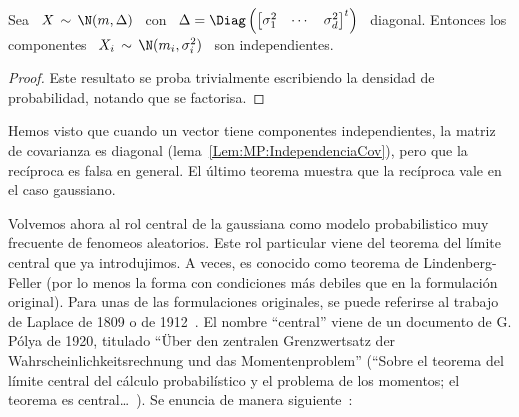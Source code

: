 %
\begin{teorema}[Independencia]
\label{Teo:MP:IndependenciaGaussiana}
%
  Sea   \   $X  \,   \sim   \,   \N(m,\Delta)$  \   con   \   $\Delta  =   \Diag
  \left(  \begin{bmatrix}  \sigma_1^2  &  \cdots  &  \sigma_d^2  \end{bmatrix}^t
  \right)$   \  diagonal.   Entonces  los   componentes  \   $X_i  \,   \sim  \,
  \N(m_i,\sigma_i^2)$ \ son independientes.
\end{teorema}
%
\begin{proof}
  Este resultato se proba  trivialmente escribiendo la densidad de probabilidad,
  notando que se factorisa.
\end{proof}
%
Hemos visto que cuando un  vector tiene componentes independientes, la matriz de
covarianza  es   diagonal  (lema~\ref{Lem:MP:IndependenciaCov}),  pero   que  la
rec\'iproca es falsa en general.  El \'ultimo teorema muestra que la rec\'iproca
vale en el caso gaussiano.

Volvemos ahora  al rol  central de la  gaussiana como modelo  probabilistico muy
frecuente  de fenomeos  aleatorios. Este  rol particular  viene del  teorema del
l\'imite  central que ya  introdujimos.  A  veces, es  conocido como  teorema de
Lindenberg-Feller (por lo menos la forma con condiciones m\'as debiles que en la
formulaci\'on original).   Para unas de  las formulaciones originales,  se puede
referirse  al trabajo  de Laplace  de  1809 o  de 1912~\cite{Lap09,  Lap09:Supp,
  Lap20}.  El nombre  ``central'' viene de un documento de  G.  P\'olya de 1920,
titulado  ``\"Uber den  zentralen Grenzwertsatz  der Wahrscheinlichkeitsrechnung
und das Momentenproblem'' (``Sobre el teorema del l\'imite central del c\'alculo
probabil\'istico   y   el   problema    de   los   momentos;   el   teorema   es
central\ldots~\cite{Pol20, Cam86}).  Se enuncia de manera siguiente~\cite{Spi76,
  BroDav87, LehCas98, AshDol99, JacPro03, AthLah06, Bil12}:

